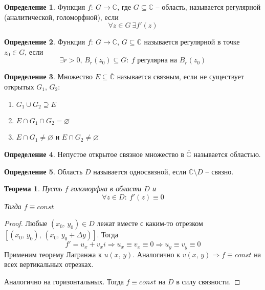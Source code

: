 \documentclass[a4paper,12pt]{article}
\renewcommand{\emptyset}{\ensuremath{\varnothing}}
\theoremstyle{plain}
\newtheorem{theorem}{Теорема}[section]
\theoremstyle{definition}
\newtheorem{definition}{Определение}[section]
\theoremstyle{remark}
\begin{document}
\begin{definition}
	Функция $f :\: G \to \mathbb{C}$, где $G \subseteq \mathbb{C}$ -- область, называется регулярной (аналитической, голоморфной), если
	\[
		\forall z \in G \: \exists f'(z)
	\]
\end{definition}

\begin{definition}
	Функция $f :\: G \to \mathbb{C},\, G \subseteq \mathbb{C}$ называется регулярной в точке $z_0 \in G$, если
	\[
		\exists r > 0,\, B_r(z_0) \subseteq G :\: f \text{ регулярна на }B_r(z_0)
	\]
\end{definition}

\begin{definition}
	Множество $E \subseteq \overline{\mathbb{C}}$ называется связным, если не существует открытых $G_1,\, G_2$:
	\begin{enumerate}
		\item $G_1 \cup G_2 \supseteq E$
		\item $E \cap G_1 \cap G_2 = \emptyset$
		\item $E \cap G_1 \neq \emptyset$ и $E \cap G_2 \neq \emptyset$
	\end{enumerate}
\end{definition}

\begin{definition}
	Непустое открытое связное множество в $\overline{\mathbb{C}}$ называется областью.
\end{definition}

\begin{definition}
	Область $D$ называется односвязной, если $\overline{\mathbb{C}} \setminus D$ -- связно.
\end{definition}

\begin{theorem}
	Пусть $f$ голоморфна в области $D$ и
	\[
		\forall z \in D :\: f'(z) \equiv 0
	\]
	Тогда $f \equiv const$
\end{theorem}

\begin{proof}
	Любые $(x_0,\, y_0) \in D$ лежат вместе с каким-то отрезком $[(x_0,\, y_0),\, (x_0,\, y_0 + \Delta y)]$. Тогда
	\[
		f' = u_x + v_xi \Rightarrow u_x \equiv v_x \equiv 0 \Rightarrow u_y \equiv v_y \equiv 0
	\]
	Применим теорему Лагранжа к $u(x,\,y)$. Аналогично к $v(x,\,y) \Rightarrow f \equiv const$ на всех вертикальных отрезках.

	Аналогично на горизонтальных. Тогда $f \equiv const$ на $D$ в силу связности.
\end{proof}
\end{document}

